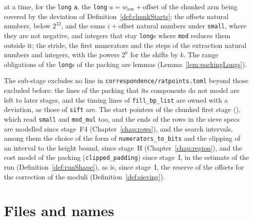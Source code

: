 \begin{itemize}
    at a time, for the \verb|long| \verb|a|, the \verb|long|
    $a = w_{\mathrm{low}} + \mathrm{offset}$ of the chunked arm being covered by the deviation of
    Definition~\ref{def:chunkStarts}; the offsets natural numbers, below $2^{32}$, and the sums
    $i + \mathrm{offset}$ natural numbers under \verb|small|, where they are not negative, and
    integers that stay \verb|long|s where \verb|mod| reduces them outside it; the stride, the first
    numerators and the steps of the extraction natural numbers and integers, with the powers $2^k$
    for the shifts by $k$. The range obligations of the \verb|long|s of the packing are lemmas
    (Lemma~\ref{lem:packingLongs}).
\end{itemize}
The sub-stage excludes no line in \verb|correspondence/ratpoints.toml| beyond those excluded before:
the lines of the packing that its components do not model are left to later stages, and the timing
lines of \verb|fill_bp_list| are owned with a deviation, as those of \verb|sift| are. The start
pointers of the chunked first stage (), which read \verb|small| and
\verb|mod_mul| too, and the ends of the rows in the sieve specs are modelled since stage~F4
(Chapter~\ref{chap:rows}), and the search intervals, among them the choice of the form of
\verb|numerators_to_bits| and the clipping of an interval to the height bound, since stage~H
(Chapter~\ref{chap:region}), and the cost model of the packing (\verb|clipped_padding|) since
stage~I, in the estimate of the run (Definition~\ref{def:runShape}), as is, since stage~I, the
reserve of the offsets for the correction of the moduli (Definition~\ref{def:sieving}).

\section{Files and names}\label{sec:packingFiles}

